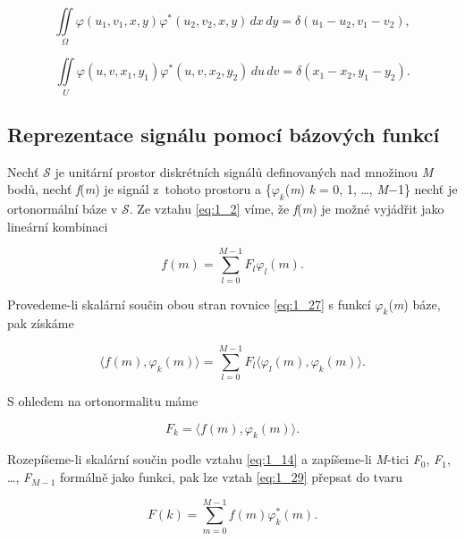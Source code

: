 \begin{equation} \label{eq:1_25}
    \iint\limits_{\Omega} \varphi(u_1, v_1, x, y) \varphi^*(u_2, v_2, x, y)\, dx\, dy = \delta(u_1 - u_2, v_1 - v_2),
\end{equation}

\begin{equation} \label{eq:1_26}
    \iint\limits_{U} \varphi(u, v, x_1, y_1) \varphi^*(u, v, x_2, y_2)\, du\, dv = \delta(x_1 - x_2, y_1 - y_2).
\end{equation}

\subsection*{Reprezentace signálu pomocí bázových funkcí}

Nechť $\mathscr{S}$ je unitární prostor diskrétních signálů definovaných nad množinou \textit{M} bodů, nechť \textit{f}(\textit{m}) je signál z~tohoto prostoru a \{$\varphi_k$(\textit{m}) \textbar  \textit{k} = 0, 1, \dots, \textit{M}$-$1\} nechť je ortonormální báze v $\mathscr{S}$. Ze vztahu \eqref{eq:1_2} víme, že \textit{f}(\textit{m}) je možné vyjádřit jako lineární kombinaci

\begin{equation} \label{eq:1_27}
    f(m) = \sum\limits_{l=0}^{M-1} F_l \varphi_l (m).
\end{equation}

Provedeme-li skalární součin obou stran rovnice \eqref{eq:1_27} s funkcí $\varphi_k$(\textit{m}) báze, pak získáme

\begin{equation} \label{eq:1_28}
    \langle f(m), \varphi_k(m) \rangle = \sum\limits_{l=0}^{M-1} F_l \langle \varphi_l(m), \varphi_k(m) \rangle.
\end{equation}

S ohledem na ortonormalitu máme

\begin{equation} \label{eq:1_29}
    F_k = \langle f(m), \varphi_k(m) \rangle.
\end{equation}

Rozepíšeme-li skalární součin podle vztahu \eqref{eq:1_14} a zapíšeme-li \textit{M}-tici \textit{F}$_0$, \textit{F}$_1$, \dots, \textit{F}$_{M-1}$ formálně jako funkci, pak lze vztah \eqref{eq:1_29} přepsat do tvaru

\begin{equation} \label{eq:1_30}
    F(k) = \sum\limits_{m=0}^{M-1} f(m) \varphi_k^*(m).
\end{equation}

